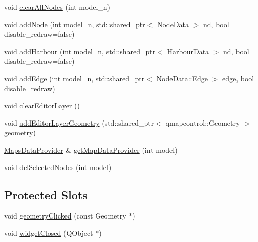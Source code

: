 \begin{DoxyCompactItemize}
void \mbox{\hyperlink{class_map_objects_controller_a00450d5120a4b2bd5f5e3c848f3a7f5c}{clear\+All\+Nodes}} (int model\+\_\+n)
\item 
void \mbox{\hyperlink{class_map_objects_controller_a4bf46a64130bed383031cc73d6af6dbb}{add\+Node}} (int model\+\_\+n, std\+::shared\+\_\+ptr$<$ \mbox{\hyperlink{class_node_data}{Node\+Data}} $>$ nd, bool disable\+\_\+redraw=false)
\item 
void \mbox{\hyperlink{class_map_objects_controller_a55da86224f6f8c6cfde8767b1e0d1a36}{add\+Harbour}} (int model\+\_\+n, std\+::shared\+\_\+ptr$<$ \mbox{\hyperlink{class_harbour_data}{Harbour\+Data}} $>$ nd, bool disable\+\_\+redraw=false)
\item 
void \mbox{\hyperlink{class_map_objects_controller_aacce574a64f61da2f247942daabbf2c0}{add\+Edge}} (int model\+\_\+n, std\+::shared\+\_\+ptr$<$ \mbox{\hyperlink{struct_node_data_1_1_edge}{Node\+Data\+::\+Edge}} $>$ \mbox{\hyperlink{structedge}{edge}}, bool disable\+\_\+redraw)
\item 
void \mbox{\hyperlink{class_map_objects_controller_a63542e3a1500eddc9262bfc73136bd62}{clear\+Editor\+Layer}} ()
\item 
void \mbox{\hyperlink{class_map_objects_controller_a6c86ec47a7b85404818cf71335c34269}{add\+Editor\+Layer\+Geometry}} (std\+::shared\+\_\+ptr$<$ qmapcontrol\+::\+Geometry $>$ geometry)
\item 
\mbox{\hyperlink{class_maps_data_provider}{Maps\+Data\+Provider}} \& \mbox{\hyperlink{class_map_objects_controller_a5ff7247c767701b167246621e58c3662}{get\+Map\+Data\+Provider}} (int model)
\item 
void \mbox{\hyperlink{class_map_objects_controller_aa46624ade70b59a6c8e7fa2c3f9083a4}{del\+Selected\+Nodes}} (int model)
\end{DoxyCompactItemize}
\subsection*{Protected Slots}
\begin{DoxyCompactItemize}
\item 
void \mbox{\hyperlink{class_map_objects_controller_af1252207d1107ba66e1f21f548c193ab}{geometry\+Clicked}} (const Geometry $\ast$)
\item 
void \mbox{\hyperlink{class_map_objects_controller_a7749993f9346e42a40200002956ff024}{widget\+Closed}} (Q\+Object $\ast$)
\end{DoxyCompactItemize}
